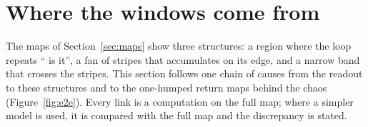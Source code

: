 
\section{Where the windows come from}
\label{sec:e2e}

The maps of Section~\ref{sec:maps} show three structures: a region where the loop repeats `` is it'', a fan of
stripes that accumulates on its edge, and a narrow band that crosses the stripes. This section follows one chain of
causes from the readout to these structures and to the one-humped return maps behind the chaos
(Figure~\ref{fig:e2e}). Every link is a computation on the full map; where a simpler model is used, it is compared
with the full map and the discrepancy is stated.


